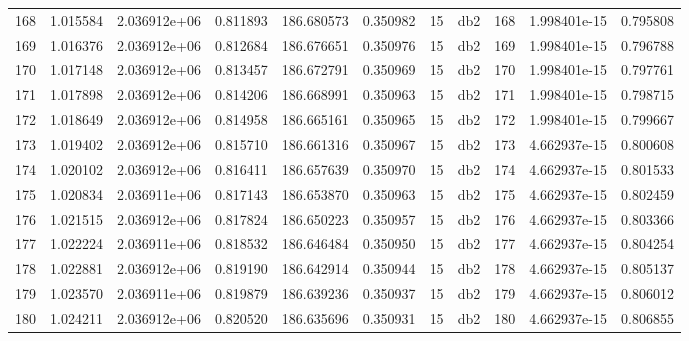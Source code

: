 \begin{tabular}{lrrrrrrlrrr}
168  &    1.015584 &        2.036912e+06 &  0.811893 &              186.680573 &    0.350982 &      15 &          db2 &    168 &   1.998401e-15 &      0.795808 \\
169  &    1.016376 &        2.036912e+06 &  0.812684 &              186.676651 &    0.350976 &      15 &          db2 &    169 &   1.998401e-15 &      0.796788 \\
170  &    1.017148 &        2.036912e+06 &  0.813457 &              186.672791 &    0.350969 &      15 &          db2 &    170 &   1.998401e-15 &      0.797761 \\
171  &    1.017898 &        2.036912e+06 &  0.814206 &              186.668991 &    0.350963 &      15 &          db2 &    171 &   1.998401e-15 &      0.798715 \\
172  &    1.018649 &        2.036912e+06 &  0.814958 &              186.665161 &    0.350965 &      15 &          db2 &    172 &   1.998401e-15 &      0.799667 \\
173  &    1.019402 &        2.036912e+06 &  0.815710 &              186.661316 &    0.350967 &      15 &          db2 &    173 &   4.662937e-15 &      0.800608 \\
174  &    1.020102 &        2.036912e+06 &  0.816411 &              186.657639 &    0.350970 &      15 &          db2 &    174 &   4.662937e-15 &      0.801533 \\
175  &    1.020834 &        2.036911e+06 &  0.817143 &              186.653870 &    0.350963 &      15 &          db2 &    175 &   4.662937e-15 &      0.802459 \\
176  &    1.021515 &        2.036912e+06 &  0.817824 &              186.650223 &    0.350957 &      15 &          db2 &    176 &   4.662937e-15 &      0.803366 \\
177  &    1.022224 &        2.036911e+06 &  0.818532 &              186.646484 &    0.350950 &      15 &          db2 &    177 &   4.662937e-15 &      0.804254 \\
178  &    1.022881 &        2.036912e+06 &  0.819190 &              186.642914 &    0.350944 &      15 &          db2 &    178 &   4.662937e-15 &      0.805137 \\
179  &    1.023570 &        2.036911e+06 &  0.819879 &              186.639236 &    0.350937 &      15 &          db2 &    179 &   4.662937e-15 &      0.806012 \\
180  &    1.024211 &        2.036912e+06 &  0.820520 &              186.635696 &    0.350931 &      15 &          db2 &    180 &   4.662937e-15 &      0.806855 \\

\end{tabular}
